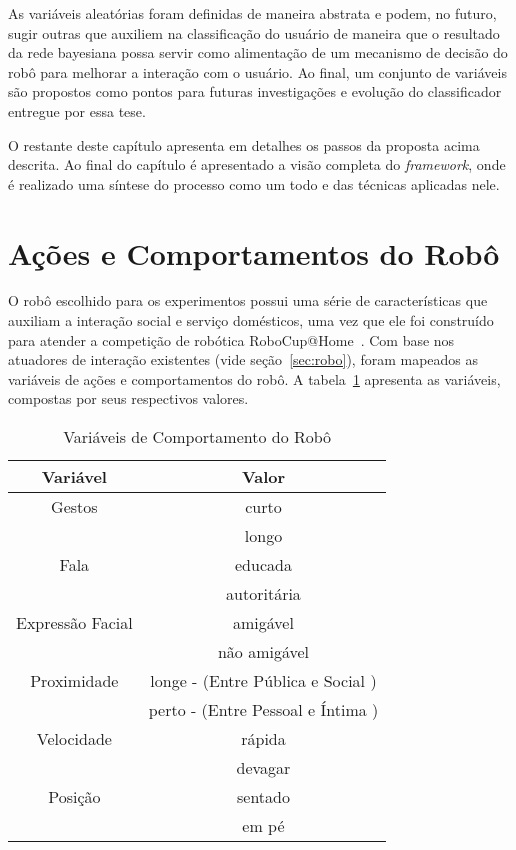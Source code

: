 As variáveis aleatórias foram definidas de maneira abstrata e podem, no futuro, sugir outras que auxiliem na classificação do usuário de maneira que o resultado da rede bayesiana possa servir como alimentação de um mecanismo de decisão do robô para melhorar a interação com o usuário. Ao final, um conjunto de variáveis são propostos como pontos para futuras investigações e evolução do classificador entregue por essa tese.

O restante deste capítulo apresenta em detalhes os passos da proposta acima descrita. Ao final do capítulo é apresentado a visão completa do \emph{framework}, onde é realizado uma síntese do processo como um todo e das técnicas aplicadas nele.

\section{Ações e Comportamentos do Robô}
\label{sec:comportamento-robo}
O robô escolhido para os experimentos possui uma série de características que auxiliam a interação social e serviço domésticos, uma vez que ele foi construído para atender a competição de robótica RoboCup@Home~\cite{robocup:2015}. Com base nos atuadores de interação existentes (vide seção~\ref{sec:robo}), foram mapeados as variáveis de ações e comportamentos do robô. A tabela~\ref{tab:variaveisvalores} apresenta as variáveis, compostas por seus respectivos valores.

\begin{table}[!ht]
	\caption{Variáveis de Comportamento do Robô}
	\label{tab:variaveisvalores}
	\centering
	\begin{tabular}{c | c}
		\hline
		Variável & Valor \\
		\hline
		Gestos & curto \\
		& longo \\
		\hline
		Fala & educada \\
		& autoritária \\
		\hline
		Expressão Facial & amigável \\
		& não amigável \\
		\hline
		Proximidade & longe - (Entre Pública e Social ) \\
		& perto - (Entre Pessoal e Íntima ) \\
		\hline
		Velocidade & rápida \\
		& devagar \\
		\hline
		Posição & sentado \\
		& em pé \\
		\hline
	\end{tabular}
\end{table}


